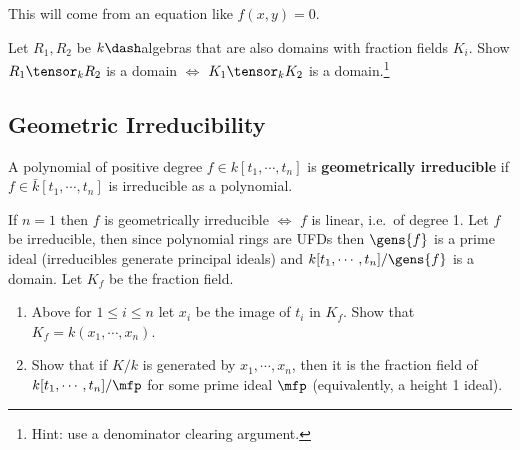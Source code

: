 \begin{answer}

This will come from an equation like \(f(x, y) = 0\).

\end{answer}

\begin{exercise}

Let \(R_1, R_2\) be \(k\dash\)algebras that are also domains with
fraction fields \(K_i\). Show \(R_1 \tensor_k R_2\) is a domain \(\iff\)
\(K_1 \tensor_k K_2\) is a domain.\footnote{Hint: use a denominator
  clearing argument.}

\end{exercise}

\hypertarget{geometric-irreducibility}{%
\subsection{Geometric Irreducibility}\label{geometric-irreducibility}}

\begin{definition}

A polynomial of positive degree \(f\in k[t_1, \cdots, t_n]\) is
\textbf{geometrically irreducible} if \(f\in \bar k[t_1, \cdots, t_n]\)
is irreducible as a polynomial.

\end{definition}

\begin{remark}

If \(n=1\) then \(f\) is geometrically irreducible \(\iff\) \(f\) is
linear, i.e.~of degree 1. Let \(f\) be irreducible, then since
polynomial rings are UFDs then \(\gens{f}\) is a prime ideal
(irreducibles generate principal ideals) and
\(k[t_1, \cdots, t_n]/\gens{f}\) is a domain. Let \(K_f\) be the
fraction field.

\end{remark}

\begin{exercise}

\envlist

\begin{enumerate}
\def\labelenumi{\alph{enumi}.}
\item
  Above for \(1\leq i \leq n\) let \(x_i\) be the image of \(t_i\) in
  \(K_f\). Show that \(K_f = k(x_1, \cdots, x_n)\).
\item
  Show that if \(K/k\) is generated by \(x_1, \cdots, x_n\), then it is
  the fraction field of \(k[t_1, \cdots, t_n] /\mfp\) for some prime
  ideal \(\mfp\) (equivalently, a height 1 ideal).
\end{enumerate}

\end{exercise}

